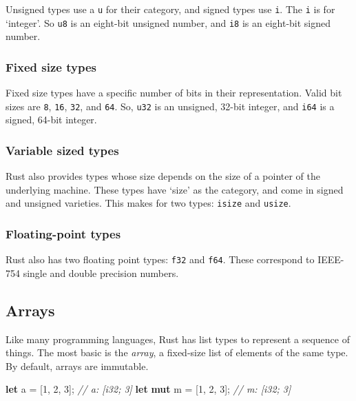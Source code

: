 \documentclass[a4paper,]{book}
\newenvironment{Shaded}{\begin{snugshade}}{\end{snugshade}}
\newcommand{\KeywordTok}[1]{\textcolor[rgb]{0.13,0.29,0.53}{\textbf{{#1}}}}
\newcommand{\DecValTok}[1]{\textcolor[rgb]{0.00,0.00,0.81}{{#1}}}
\newcommand{\CommentTok}[1]{\textcolor[rgb]{0.56,0.35,0.01}{\textit{{#1}}}}
\newcommand{\NormalTok}[1]{{#1}}
\begin{document}
Unsigned types use a \texttt{u} for their category, and signed types use
\texttt{i}. The \texttt{i} is for `integer'. So \texttt{u8} is an
eight-bit unsigned number, and \texttt{i8} is an eight-bit signed
number.

\subsubsection{Fixed size types}\label{fixed-size-types}

Fixed size types have a specific number of bits in their representation.
Valid bit sizes are \texttt{8}, \texttt{16}, \texttt{32}, and
\texttt{64}. So, \texttt{u32} is an unsigned, 32-bit integer, and
\texttt{i64} is a signed, 64-bit integer.

\subsubsection{Variable sized types}\label{variable-sized-types}

Rust also provides types whose size depends on the size of a pointer of
the underlying machine. These types have `size' as the category, and
come in signed and unsigned varieties. This makes for two types:
\texttt{isize} and \texttt{usize}.

\subsubsection{Floating-point types}\label{floating-point-types}

Rust also has two floating point types: \texttt{f32} and \texttt{f64}.
These correspond to IEEE-754 single and double precision numbers.

\subsection{Arrays}\label{arrays}

Like many programming languages, Rust has list types to represent a
sequence of things. The most basic is the \emph{array}, a fixed-size
list of elements of the same type. By default, arrays are immutable.

\begin{Shaded}
\begin{Highlighting}[]
\KeywordTok{let} \NormalTok{a = [}\DecValTok{1}\NormalTok{, }\DecValTok{2}\NormalTok{, }\DecValTok{3}\NormalTok{]; }\CommentTok{// a: [i32; 3]}
\KeywordTok{let} \KeywordTok{mut} \NormalTok{m = [}\DecValTok{1}\NormalTok{, }\DecValTok{2}\NormalTok{, }\DecValTok{3}\NormalTok{]; }\CommentTok{// m: [i32; 3]}
\end{Highlighting}
\end{Shaded}
\end{document}
